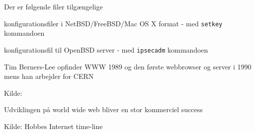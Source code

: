 \documentclass[Screen16to9,17pt]{foils}
\begin{document}

\begin{list1}
\item Der er følgende filer tilgængelige\\
  \begin{list2}
  \item konfigurationsfiler i NetBSD/FreeBSD/Mac OS X format - med
    \verb+setkey+ kommandoen
  \item konfigurationsfil til OpenBSD server - med \verb+ipsecadm+
    kommandoen
  \end{list2}
\end{list1}




\begin{list1}
\item Tim Berners-Lee opfinder WWW 1989 og den første webbrowser og
  server i 1990 mens han arbejder for CERN
\end{list1}

Kilde:



\begin{list1}
\item Udviklingen på world wide web bliver en stor kommerciel success
\end{list1}

Kilde: Hobbes Internet time-line\\

\end{document}
